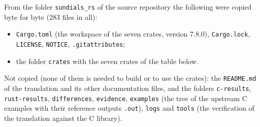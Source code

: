 \documentclass[
  10pt,
]{article}
\providecommand{\tightlist}{%
  \setlength{\itemsep}{0pt}\setlength{\parskip}{0pt}}
\begin{document}
From the folder \texttt{sundials\_rs} of the source repository the
following were copied byte for byte (283 files in all):

\begin{itemize}
\tightlist
\item
  \texttt{Cargo.toml} (the workspace of the seven crates, version
  7.8.0), \texttt{Cargo.lock}, \texttt{LICENSE}, \texttt{NOTICE},
  \texttt{.gitattributes};
\item
  the folder \texttt{crates} with the seven crates of the table below.
\end{itemize}

Not copied (none of them is needed to build or to use the crates): the
\texttt{README.md} of the translation and its other documentation files,
and the folders \texttt{c-results}, \texttt{rust-results},
\texttt{differences}, \texttt{evidence}, \texttt{examples} (the tree of
the upstream C examples with their reference outputs \texttt{.out}),
\texttt{logs} and \texttt{tools} (the verification of the translation
against the C library).
\end{document}
